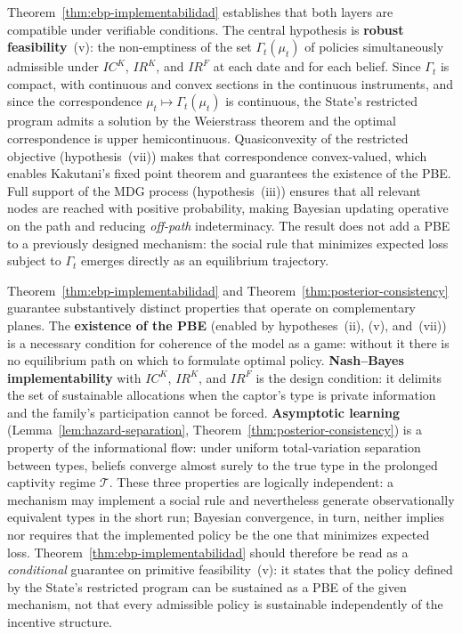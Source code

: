\documentclass[12pt,a4paper]{article}
\providecommand{\parencite}{\citep}
\theoremstyle{plain}
\theoremstyle{definition}
\theoremstyle{remark}
\newcommand{\1}{\mathbf{1}}
\begin{document}
\noindent Theorem~\ref{thm:ebp-implementabilidad} establishes that both layers are
compatible under verifiable conditions. The central hypothesis is \textbf{robust
feasibility}~\textup{(v)}: the non-emptiness of the set $\Gamma_t(\mu_t)$ of policies
simultaneously admissible under $IC^K$, $IR^K$, and $IR^F$ at each date and for each
belief. Since $\Gamma_t$ is compact, with continuous and convex sections in the
continuous instruments, and since the correspondence $\mu_t\mapsto\Gamma_t(\mu_t)$ is
continuous, the State's restricted program admits a solution by the Weierstrass theorem
and the optimal correspondence is upper hemicontinuous. Quasiconvexity of the restricted
objective \textup{(hypothesis~\textup{(vii)})} makes that correspondence convex-valued,
which enables Kakutani's fixed point theorem \parencite{Kakutani1941} and guarantees the
existence of the PBE. Full support of the MDG process \textup{(hypothesis~\textup{(iii)})}
ensures that all relevant nodes are reached with positive probability, making Bayesian
updating operative on the path and reducing \emph{off-path} indeterminacy. The result
does not add a PBE to a previously designed mechanism: the social rule that minimizes
expected loss subject to $\Gamma_t$ emerges directly as an equilibrium trajectory.

\medskip

\noindent Theorem~\ref{thm:ebp-implementabilidad} and
Theorem~\ref{thm:posterior-consistency} guarantee substantively distinct properties that
operate on complementary planes. The \textbf{existence of the PBE}
\textup{(enabled by hypotheses~\textup{(ii)}, \textup{(v)}, and~\textup{(vii)})} is a
necessary condition for coherence of the model as a game: without it there is no
equilibrium path on which to formulate optimal policy. \textbf{Nash--Bayes
implementability} with $IC^K$, $IR^K$, and $IR^F$ is the design condition: it delimits
the set of sustainable allocations when the captor's type is private information and
the family's participation cannot be forced. \textbf{Asymptotic learning}
\textup{(Lemma~\ref{lem:hazard-separation}, Theorem~\ref{thm:posterior-consistency})}
is a property of the informational flow: under uniform total-variation separation
between types, beliefs converge almost surely to the true type in the prolonged
captivity regime $\mathcal{T}$. These three properties are logically independent: a
mechanism may implement a social rule and nevertheless generate observationally
equivalent types in the short run; Bayesian convergence, in turn, neither implies nor
requires that the implemented policy be the one that minimizes expected loss.
Theorem~\ref{thm:ebp-implementabilidad} should therefore be read as a \emph{conditional}
guarantee on primitive feasibility~\textup{(v)}: it states that the policy defined by
the State's restricted program can be sustained as a PBE of the given mechanism, not
that every admissible policy is sustainable independently of the incentive structure.
\end{document}
